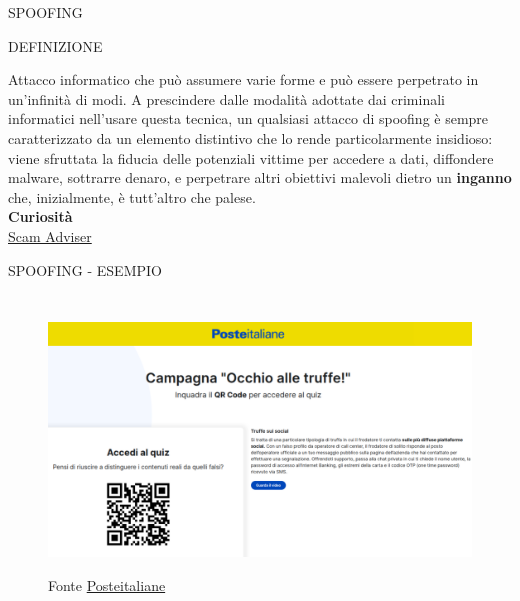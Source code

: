 \documentclass[aspectratio=1610, handout]{beamer}
\begin{document}
\begin{frame}{SPOOFING}
    \begin{alertblock}{DEFINIZIONE}
        \begin{minipage}{0.98\linewidth}
            \justifying
            Attacco informatico che può assumere varie forme e può essere perpetrato in un'infinità di modi. 
            A prescindere dalle modalità adottate dai criminali informatici nell'usare questa tecnica, 
            un qualsiasi attacco di spoofing è sempre caratterizzato da un elemento distintivo che lo 
            rende particolarmente insidioso: viene sfruttata la fiducia delle potenziali vittime per accedere a 
            dati, diffondere malware, sottrarre denaro, e perpetrare altri obiettivi malevoli dietro un 
            \textbf{inganno} che, inizialmente, è tutt'altro che palese.\\
            \bigskip
            \tiny{\textbf{Curiosità}}\\
            \tiny{\href{https://www.scamadviser.com/}{Scam Adviser}}
        \end{minipage}
    \end{alertblock}
\end{frame}

\begin{frame}{SPOOFING - ESEMPIO}
    \begin{columns}
        \column{\textwidth}
            \begin{figure}
                \href{https://www.poste.it/sicurezza-online/guide-per-operare-in-sicurezza/come-difendersi-dalle-truffe/}{\includegraphics[width=\linewidth]{img/spoofing.png}}
                \caption{{Fonte \href{https://www.poste.it/sicurezza-online/guide-per-operare-in-sicurezza/come-difendersi-dalle-truffe/}{Posteitaliane}}}
            \end{figure}
    \end{columns}
\end{frame}
\end{document}
